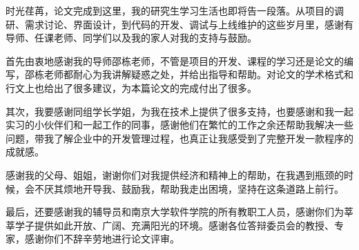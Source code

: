 \documentclass[oneside, master, UTF8]{NJUthesis}
\theoremstyle{plain}
\begin{document}





\backmatter


\begin{thanks}

\vskip 18pt

时光荏苒，论文完成到这里，我的研究生学习生活也即将告一段落。从项目的调研、需求讨论、界面设计，到代码的开发、调试与上线维护的这些岁月里，感谢有导师、任课老师、同学们以及我的家人对我的支持与鼓励。

首先由衷地感谢我的导师邵栋老师，不管是项目的开发、课程的学习还是论文的编写，邵栋老师都耐心为我讲解疑惑之处，并给出指导和帮助。对论文的学术格式和行文上也给出了很多建议，为本篇论文的完成付出了很多。

其次，我要感谢同组学长学姐，为我在技术上提供了很多支持，也要感谢和我一起实习的小伙伴们和一起工作的同事，感谢他们在繁忙的工作之余还帮助我解决一些问题，带我了解企业中的开发管理过程，也真正让我感受到了完整开发一款程序的成就感。

感谢我的父母、姐姐，谢谢你们对我提供经济和精神上的帮助，在我遇到瓶颈的时候，会不厌其烦地开导我、鼓励我，帮助我走出困境，坚持在这条道路上前行。

最后，还要感谢我的辅导员和南京大学软件学院的所有教职工人员，感谢你们为莘莘学子提供如此开放、广阔、充满阳光的环境。感谢各位答辩委员会的教授、专家，感谢你们不辞辛劳地进行论文评审。

\end{thanks}
\end{document}

